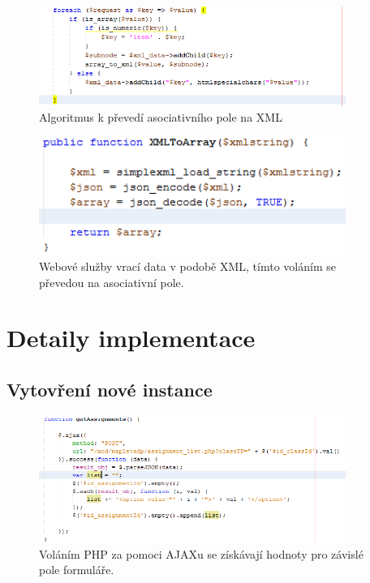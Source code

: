 \documentclass[
print,
  11pt,
  table,   
  nolof,    
  nolot,
  oneside,
  draft
]{fithesis3}
\begin{document}
		\begin{figure}
		  \begin{center}
		    \includegraphics[width=100mm]{images/prevod_na_xml.png}
		   \end{center}
		  \caption{Algoritmus k převedí asociativního pole na XML}
		  \label{fig:prevodnaxml}
		\end{figure}

		\begin{figure}
		  \begin{center}
		    \includegraphics[width=100mm]{images/xml_na_pole.png}
		   \end{center}
		  \caption{Webové služby vrací data v podobě XML, tímto voláním se převedou na asociativní pole.}
		  \label{fig:prevodnapole}
		\end{figure}

		

	\section{Detaily implementace}
		\subsection{Vytovření nové instance}
		\begin{figure}
		  \begin{center}
		    \includegraphics[width=100mm]{images/ajax-volani.png}
		   \end{center}
		  \caption{Voláním PHP za pomoci AJAXu se získávají hodnoty pro závislé pole formuláře.}
		  \label{fig:volaniajax}
		\end{figure}
\end{document}
